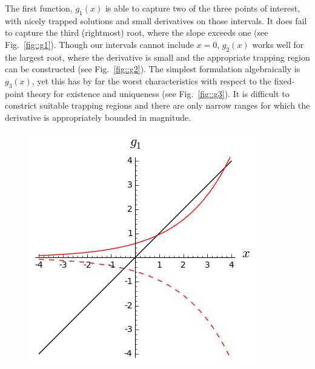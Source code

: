\documentclass[11pt]{article}
\begin{document}
The first function, \(g_1(x)\) is able to capture two of the three points of interest, with nicely trapped solutions and small derivatives on those intervals. It does fail to capture the third (rightmost) root, where the slope exceeds one (see Fig.~\ref{fig::g1}). Though our intervals cannot include \(x=0\), \(g_2(x)\) works well for the largest root, where the derivative is small and the appropriate trapping region can be constructed (see Fig.~\ref{fig::g2}). The simplest formulation algebraically is \(g_3(x)\), yet this has by far the worst characteristics with respect to the fixed-point theory for existence and uniqueness (see Fig.~\ref{fig::g3}). It is difficult to constrict suitable trapping regions and there are only narrow ranges for which the derivative is appropriately bounded in magnitude. 

\begin{figure}[ht!]
\begin{minipage}{0.48\textwidth}
\includegraphics[width=\textwidth]{1_basics/g1.png}
\end{minipage}
\begin{minipage}{0.48\textwidth}

\end{minipage}
\end{figure}
\end{document}
